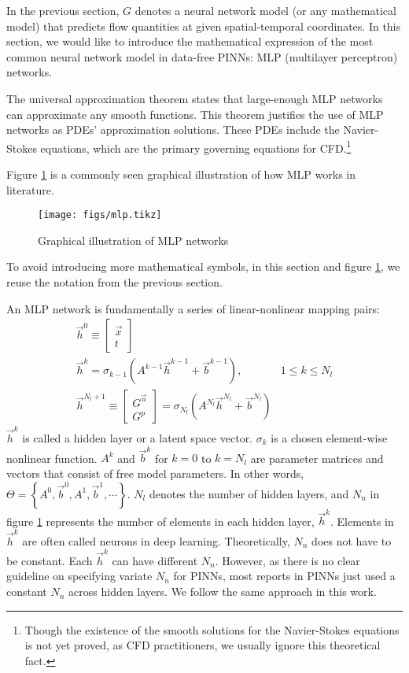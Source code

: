 
In the previous section, $G$ denotes a neural network model (or any mathematical model) that predicts flow quantities at given spatial-temporal coordinates.
In this section, we would like to introduce the mathematical expression of the most common neural network model in data-free PINNs: MLP (multilayer perceptron) networks.

The universal approximation theorem \cite{hornik_approximation_1991} states that large-enough MLP networks can approximate any smooth functions.
This theorem justifies the use of MLP networks as PDEs' approximation solutions.
These PDEs include the Navier-Stokes equations, which are the primary governing equations for CFD.\footnote[0]{Though the existence of the smooth solutions for the Navier-Stokes equations is not yet proved, as CFD practitioners, we usually ignore this theoretical fact.}

Figure \ref{fig:mlp-graph} is a commonly seen graphical illustration of how MLP works in literature.
\begin{figure}[hbt!]
    \singlespacing
    \texttt{[image: figs/mlp.tikz]}
    \caption{Graphical illustration of MLP networks}
    \label{fig:mlp-graph}
\end{figure}
To avoid introducing more mathematical symbols, in this section and figure \ref{fig:mlp-graph}, we reuse the notation from the previous section.

An MLP network is fundamentally a series of linear-nonlinear mapping pairs:
\begin{equation}\label{eq:mlp-formula}
    \begin{array}{ll}
        \vec{h}^0 \equiv \begin{bmatrix} \vec{x} \\ t \end{bmatrix} & \\
        \vec{h}^k = \sigma_{k-1}\left(A^{k-1}\vec{h}^{k-1}+\vec{b}^{k-1}\right)\text{,} & 1 \le k \le N_l \\
        \vec{h}^{N_l+1}\equiv \begin{bmatrix} G^{\vec{u}} \\ G^p \end{bmatrix} = \sigma_{N_l}\left(A^{N_l}\vec{h}^{N_l}+\vec{b}^{N_l}\right) &
    \end{array}
\end{equation}
$\vec{h}^k$ is called a hidden layer or a latent space vector.
$\sigma_{k}$ is a chosen element-wise nonlinear function.
$A^{k}$ and $\vec{b}^k$ for $k=0$ to $k=N_l$ are parameter matrices and vectors that consist of free model parameters.
In other words, $\Theta=\left\{A^0, \vec{b}^0, A^1, \vec{b}^1, \cdots \right\}$.
$N_l$ denotes the number of hidden layers, and $N_n$ in figure \ref{fig:mlp-graph} represents the number of elements in each hidden layer, $\vec{h}^k$.
Elements in $\vec{h}^k$ are often called neurons in deep learning.
Theoretically, $N_n$ does not have to be constant.
Each $\vec{h}^k$ can have different $N_n$.
However, as there is no clear guideline on specifying variate $N_n$ for PINNs, most reports in PINNs just used a constant $N_n$ across hidden layers.
We follow the same approach in this work.

